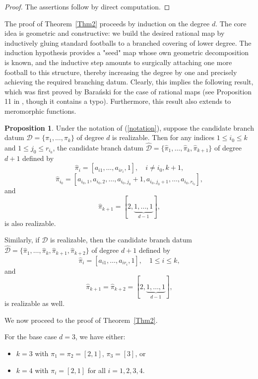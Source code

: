 \documentclass[microtype]{gtpart}     %
\theoremstyle{definition}
\newtheorem{prop}{Proposition}[section]
\begin{document}
\begin{proof}
The assertions follow by direct computation.
\end{proof}








The proof of Theorem~\ref{Thm2} proceeds by induction on the degree $d$. The core idea is geometric and constructive: we build the desired rational map by inductively gluing standard footballs to a branched covering of lower degree. The induction hypothesis provides a "seed" map whose own geometric decomposition is known, and the inductive step amounts to surgically attaching one more football to this structure, thereby increasing the degree by one and precisely achieving the required branching datum. Clearly, this implies the following result, which was first proved by Bara\'{n}ski for the case of rational maps (see Proposition 11 in \cite{Bar01}, though it contains a typo). Furthermore, this result also extends to meromorphic functions.

\begin{prop}
Under the notation of (\ref{notation}), suppose the candidate branch datum \(\mathcal{D} = \{\pi_1, \ldots, \pi_k\}\) of degree \(d\) is realizable. Then for any indices \(1 \leq i_0 \leq k\) and \(1 \leq j_0 \leq r_{i_0}\), the candidate branch datum \(\hat{\mathcal{D}} = \{\hat{\pi}_1, \ldots, \hat{\pi}_k, \hat{\pi}_{k+1}\}\) of degree \(d+1\) defined by
\[
\hat{\pi}_i = [a_{i1}, \ldots, a_{i r_i}, 1], \quad i \neq i_0, k+1,
\]
\[
\hat{\pi}_{i_0} = [a_{i_0,1}, a_{i_0,2}, \ldots, a_{i_0, j_0} + 1, a_{i_0, j_0+1}, \ldots, a_{i_0, r_{i_0}}],
\]
and
\[
\hat{\pi}_{k+1} = [2, \underbrace{1, \ldots, 1}_{d-1}],
\]
is also realizable.

Similarly, if \(\mathcal{D}\) is realizable, then the candidate branch datum \(\hat{\mathcal{D}} = \{\hat{\pi}_1, \ldots, \hat{\pi}_k, \hat{\pi}_{k+1}, \hat{\pi}_{k+2}\}\) of degree \(d+1\) defined by
\[
\hat{\pi}_i = [a_{i1}, \ldots, a_{i r_i}, 1], \quad 1 \leq i \leq k,
\]
and
\[
\hat{\pi}_{k+1} = \hat{\pi}_{k+2} = [2, \underbrace{1, \ldots, 1}_{d-1}],
\]
is realizable as well.
\end{prop}

 We now proceed to the proof of Theorem~\ref{Thm2}.

For the base case \( d = 3 \), we have either:
\begin{itemize}
    \item \( k = 3 \) with \( \pi_1 = \pi_2 = [2, 1] \), \( \pi_3 = [3] \), or
    \item \( k = 4 \) with \( \pi_i = [2, 1] \) for all \( i = 1, 2, 3, 4 \).
\end{itemize}
\end{document}
